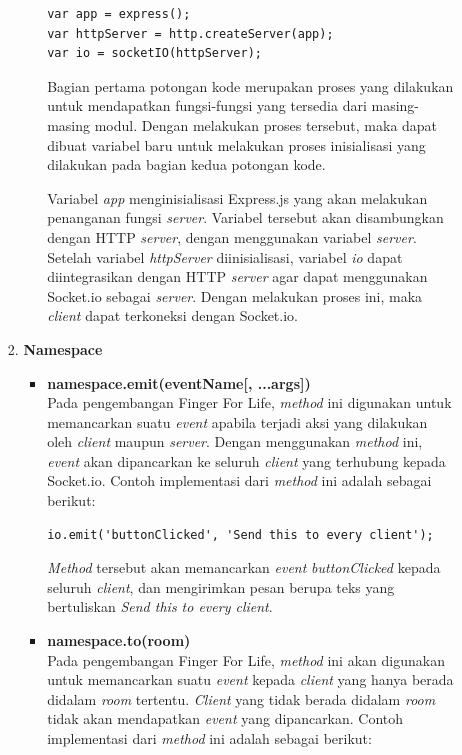 \begin{enumerate}
\begin{enumerate}
\begin{enumerate}
\begin{itemize}
\begin{lstlisting}
var app = express();
var httpServer = http.createServer(app);
var io = socketIO(httpServer);
\end{lstlisting}
				Bagian pertama potongan kode merupakan proses yang dilakukan untuk mendapatkan fungsi-fungsi yang tersedia dari masing-masing modul. Dengan melakukan proses tersebut, maka dapat dibuat variabel baru untuk melakukan proses inisialisasi yang dilakukan pada bagian kedua potongan kode.

				Variabel \textit{app} menginisialisasi Express.js yang akan melakukan penanganan fungsi \textit{server}. Variabel tersebut akan disambungkan dengan HTTP \textit{server}, dengan menggunakan variabel \textit{server}. Setelah variabel \textit{httpServer} diinisialisasi, variabel \textit{io} dapat diintegrasikan dengan HTTP \textit{server} agar dapat menggunakan Socket.io sebagai \textit{server}. Dengan melakukan proses ini, maka \textit{client} dapat terkoneksi dengan Socket.io.
				
			\end{itemize}
		
			\item \textbf{Namespace} \\
			\begin{itemize}
				\item \textbf{namespace.emit(eventName[, ...args])} \\
				Pada pengembangan Finger For Life, \textit{method} ini digunakan untuk memancarkan suatu \textit{event} apabila terjadi aksi yang dilakukan oleh \textit{client} maupun \textit{server}. Dengan menggunakan \textit{method} ini, \textit{event} akan dipancarkan ke seluruh \textit{client} yang terhubung kepada Socket.io. Contoh implementasi dari \textit{method} ini adalah sebagai berikut:
\begin{lstlisting}
io.emit('buttonClicked', 'Send this to every client');
\end{lstlisting}

				\textit{Method} tersebut akan memancarkan \textit{event} \textit{buttonClicked} kepada seluruh \textit{client}, dan mengirimkan pesan berupa teks yang bertuliskan \textit{Send this to every client}.
				
				\item \textbf{namespace.to(room)} \\
				Pada pengembangan Finger For Life, \textit{method} ini akan digunakan untuk memancarkan suatu \textit{event} kepada \textit{client} yang hanya berada didalam \textit{room} tertentu. \textit{Client} yang tidak berada didalam \textit{room} tidak akan mendapatkan \textit{event} yang dipancarkan. Contoh implementasi dari \textit{method} ini adalah sebagai berikut:


\end{itemize}
\end{enumerate}
\end{enumerate}
\end{enumerate}
